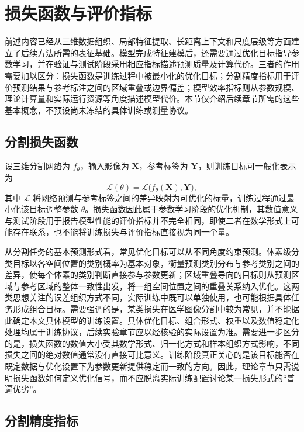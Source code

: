 \section{损失函数与评价指标}

前述内容已经从三维数据组织、局部特征提取、长距离上下文和尺度层级等方面建立了后续方法所需的表征基础。模型完成特征建模后，还需要通过优化目标指导参数学习，并在验证与测试阶段采用相应指标描述预测质量及计算代价。三者的作用需要加以区分：损失函数是训练过程中被最小化的优化目标；分割精度指标用于评价预测结果与参考标注之间的区域重叠或边界偏差；模型效率指标则从参数规模、理论计算量和实际运行资源等角度描述模型代价。本节仅介绍后续章节所需的这些基本概念，不预设尚未冻结的具体训练或测量协议。

\subsection{分割损失函数}

设三维分割网络为 \(f_{\theta}\)，输入影像为 \(\mathbf X\)，参考标签为 \(\mathbf Y\)，则训练目标可一般化表示为
\begin{equation}
\label{eq:ch2-general-loss}
\mathcal{L}(\theta)
=
\mathcal{L}\big(f_{\theta}(\mathbf X),\mathbf Y\big),
\end{equation}
其中 \(\mathcal{L}\) 将网络预测与参考标签之间的差异映射为可优化的标量，训练过程通过最小化该目标调整参数 \(\theta\)。损失函数因此属于参数学习阶段的优化机制，其数值意义与测试阶段用于报告模型性能的评价指标并不完全相同，即使二者在数学形式上可能存在联系，也不能将训练损失与评价指标直接视为同一个量。

从分割任务的基本预测形式看，常见优化目标可以从不同角度约束预测。体素级分类目标以各空间位置的类别概率为基本对象，衡量预测类别分布与参考类别之间的差异，使每个体素的类别判断直接参与参数更新；区域重叠导向的目标则从预测区域与参考区域的整体一致性出发，将一组空间位置之间的重叠关系纳入优化。这两类思想关注的误差组织方式不同，实际训练中既可以单独使用，也可能根据具体任务形成组合目标。需要强调的是，某类损失在医学图像分割中较为常见，并不能据此确定本文具体模型的训练设置。具体优化目标、组合形式、权重以及数值稳定化处理均属于训练协议，后续实验章节应以经核验的实际设置为准。需要进一步区分的是，损失函数的数值大小受其数学形式、归一化方式和样本组织方式影响，不同损失之间的绝对数值通常没有直接可比意义。训练阶段真正关心的是该目标能否在既定数据与优化设置下为参数更新提供稳定而一致的方向。因此，理论章节只需说明损失函数如何定义优化信号，而不应脱离实际训练配置讨论某一损失形式的“普遍优劣”。

\subsection{分割精度指标}

